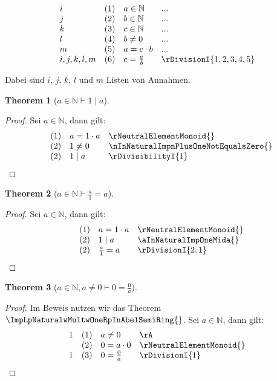 \documentclass{book}
\theoremstyle{plain}
\newtheorem{theorem}{Theorem}
\theoremstyle{remark}
\theoremstyle{definition}
\begin{document}
\[
\begin{array}{llll}
    i & (1) & a \in \mathbb{N} & ... \\
    j & (2) & b \in \mathbb{N} & ... \\
    k & (3) & c \in \mathbb{N} & ... \\
    l & (4) & b\neq 0 & ... \\
    m & (5) & a=c\cdot b & ... \\
    i,j,k,l,m & (6) & c = \frac{a}{b} & \rDivisionI{1,2,3,4,5} \\
\end{array}
\]

Dabei sind \( i \), \( j \), \(k\), \(l\) und \( m \) Listen von Annahmen.

\label{aInNaturalImpOneMida}
\begin{theorem}[\(a\in\mathbb{N}\vdash 1\mid a\)]
\end{theorem}
\begin{proof}
Sei \(a\in\mathbb{N}\), dann gilt:
        \[
	\begin{array}{llll}
                &  (1)  & a=1\cdot a & \rNeutralElementMonoid{} \\
                &  (2)  & 1\neq 0 & \nInNaturalImpnPlusOneNotEqualsZero{} \\
                &  (2)  & 1\mid a & \rDivisibilityI{1} \\
    \end{array}
	\]
\end{proof}

\label{aInNaturalImpLpaRpDurchLpOneRpEqualsa}
\begin{theorem}[\(a\in\mathbb{N}\vdash \frac{a}{1}=a\)]
\end{theorem}
\begin{proof}
Sei \(a\in\mathbb{N}\), dann gilt:
        \[
	\begin{array}{llll}
                &  (1)  & a=1\cdot a & \rNeutralElementMonoid{} \\
                &  (2)  & 1\mid a& \aInNaturalImpOneMida{} \\
                &  (2)  & \frac{a}{1}=a & \rDivisionI{2,1} \\
    \end{array}
	\]
\end{proof}


\label{aInNaturalwaNotEqualsZeroImpLpZeroRpDurchLpaRpEqualsZero}
\begin{theorem}[\(a\in\mathbb{N},a\neq 0\vdash 0=\frac{0}{a}\)]
\end{theorem}
\begin{proof}
Im Beweis nutzen wir das Theorem \(\ImpLpNaturalwMultwOneRpInAbelSemiRing{}\). 
Sei \(a\in\mathbb{N}\), dann gilt:
        \[
	\begin{array}{llll}
        1       &  (1)  & a\neq 0 & \rA \\
                &  (2)  & 0=a\cdot 0 & \rNeutralElementMonoid{} \\
        1       &  (3)  & 0=\frac{0}{a} & \rDivisionI{1} \\
    \end{array}
	\]
\end{proof}
\end{document}

